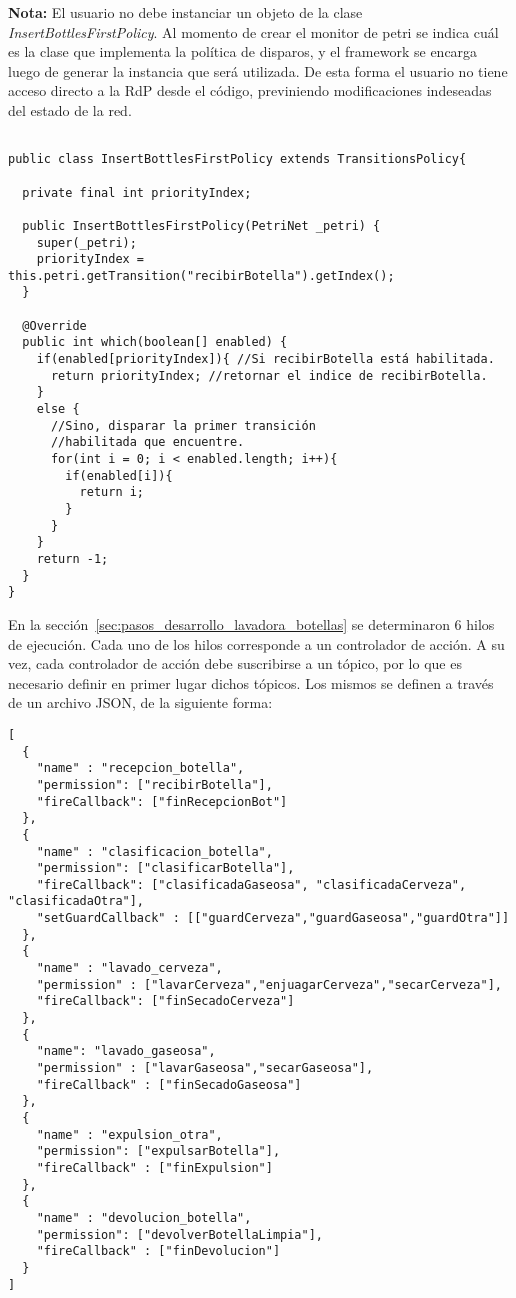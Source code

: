 \begin{framed}
\textbf{Nota:} El usuario no debe instanciar un objeto de la clase
\emph{InsertBottlesFirstPolicy}. Al momento de crear el monitor de petri se
indica cuál es la clase que implementa la política de disparos, y el framework
se encarga luego de generar la instancia que será utilizada. De esta forma el
usuario no tiene acceso directo a la RdP desde el código, previniendo
modificaciones indeseadas del estado de la red.
\end{framed}


\begin{verbatim}

public class InsertBottlesFirstPolicy extends TransitionsPolicy{

  private final int priorityIndex;

  public InsertBottlesFirstPolicy(PetriNet _petri) { 
    super(_petri); 
    priorityIndex = this.petri.getTransition("recibirBotella").getIndex(); 
  }
  
  @Override
  public int which(boolean[] enabled) {
    if(enabled[priorityIndex]){ //Si recibirBotella está habilitada.
      return priorityIndex; //retornar el indice de recibirBotella.
    }
    else {
      //Sino, disparar la primer transición 
      //habilitada que encuentre.
      for(int i = 0; i < enabled.length; i++){
        if(enabled[i]){
          return i; 
        }
      }
    }
    return -1;
  }
}
\end{verbatim}

En la sección~\ref{sec:pasos_desarrollo_lavadora_botellas} se determinaron 6
hilos de ejecución. Cada uno de los hilos corresponde a un controlador de
acción. A su vez, cada controlador de acción debe suscribirse a
un tópico, por lo que es necesario definir en primer lugar dichos tópicos. Los
mismos se definen a través de un archivo JSON, de la siguiente forma:\\
\begin{verbatim}
[
  {
    "name" : "recepcion_botella",
    "permission": ["recibirBotella"],
    "fireCallback": ["finRecepcionBot"]
  },
  {
    "name" : "clasificacion_botella",
    "permission": ["clasificarBotella"],
    "fireCallback": ["clasificadaGaseosa", "clasificadaCerveza", "clasificadaOtra"],
    "setGuardCallback" : [["guardCerveza","guardGaseosa","guardOtra"]]
  },
  {
    "name" : "lavado_cerveza",
    "permission" : ["lavarCerveza","enjuagarCerveza","secarCerveza"],
    "fireCallback": ["finSecadoCerveza"]
  },
  {
    "name": "lavado_gaseosa",
    "permission" : ["lavarGaseosa","secarGaseosa"],
    "fireCallback" : ["finSecadoGaseosa"]
  },
  {
    "name" : "expulsion_otra",
    "permission": ["expulsarBotella"],
    "fireCallback" : ["finExpulsion"]
  },
  {
    "name" : "devolucion_botella",
    "permission": ["devolverBotellaLimpia"],
    "fireCallback" : ["finDevolucion"]
  }
]
\end{verbatim}

